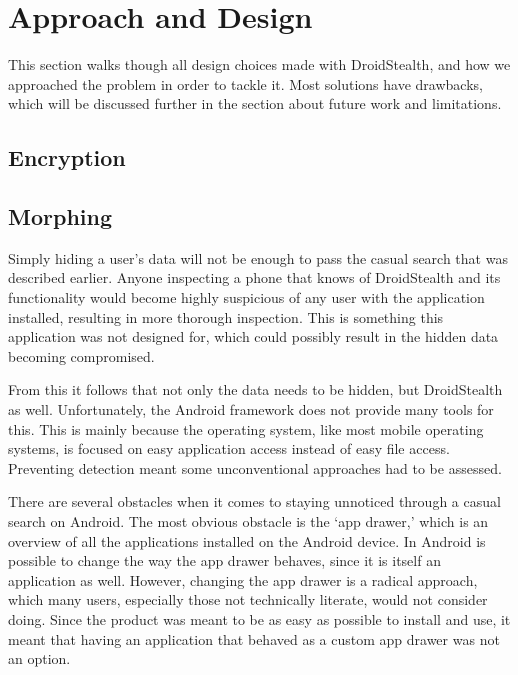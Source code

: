 \section{Approach and Design}
\label{sec:approach-and-design}
This section walks though all design choices made with DroidStealth,
and how we approached the problem in order to tackle it. Most 
solutions have drawbacks, which will be discussed further in the
section about future work and limitations. %


\subsection{Encryption}
\label{sec:approach-and-design:encryption}

\subsection{Morphing}
\label{sec:approach-and-design:morphing}

Simply hiding a user's data will not be enough to pass the casual search that was described earlier. 
Anyone inspecting a phone that knows of DroidStealth and its functionality would become highly suspicious of any user with the application installed, resulting in more thorough inspection. 
This is something this application was not designed for, which could possibly result in the hidden data becoming compromised. 

From this it follows that not only the data needs to be hidden, but DroidStealth as well. 
Unfortunately, the Android framework does not provide many tools for this. 
This is mainly because the operating system, like most mobile operating systems, is focused on easy application access instead of easy file access. 
Preventing detection meant some unconventional approaches had to be assessed.

There are several obstacles when it comes to staying unnoticed through a casual search on Android. 
The most obvious obstacle is the `app drawer,' which is an overview of all the applications installed on the Android device.
In Android is possible to change the way the app drawer behaves, since it is itself an application as well.
However, changing the app drawer is a radical approach, which many users, especially those not technically literate, would not consider doing.
Since the product was meant to be as easy as possible to install and use, it meant that having an application that behaved as a custom app drawer was not an option.

